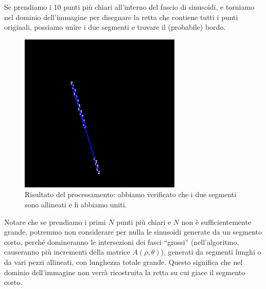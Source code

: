 \documentclass[a4paper,11pt]{article}
\begin{document}
Se prendiamo i 10 punti più chiari all'interno del fascio di sinusoidi, e torniamo nel dominio dell'immagine per disegnare la retta che contiene tutti i punti
originali, possiamo unire i due segmenti e trovare il (probabile) bordo.

\renewcommand{\thefigure}{10.7}
\begin{figure}[!h]
  \centering
    \includegraphics[scale=0.5]{images/10/one_line_final_result.png}
    \caption{Risultato del processamento: abbiamo verificato che i due segmenti sono allineati e li abbiamo uniti.}
\end{figure}

Notare che se prendiamo i primi $N$ punti più chiari e $N$ non è sufficientemente grande, potremmo non considerare per nulla le sinusoidi generate da un segmento corto,
perché domineranno le intersezioni dei fasci ``grossi'' (nell'algoritmo, causeranno più incrementi della matrice $A(\rho,\theta)$), generati da segmenti
lunghi o da vari pezzi allineati, con lunghezza totale grande. Questo significa che
nel dominio dell'immagine non verrà ricostruita la retta su cui giace il segmento corto.
\end{document}
